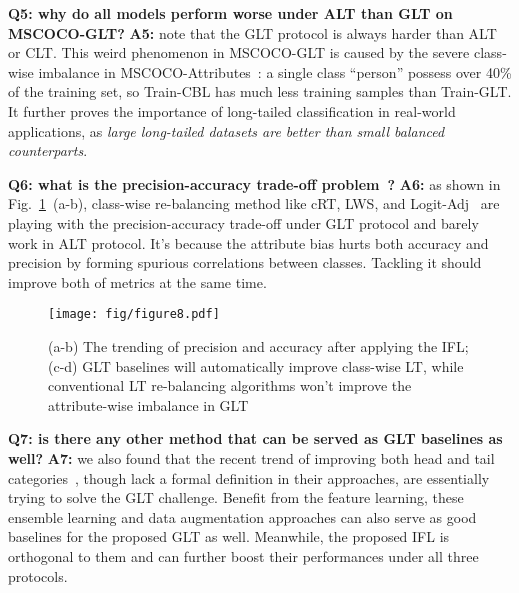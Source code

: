 \documentclass{article}
\begin{document}
\noindent\textbf{Q5: why do all models perform worse under ALT than GLT on MSCOCO-GLT?} \textbf{A5: } note that the GLT protocol is always harder than ALT or CLT. This weird phenomenon in MSCOCO-GLT is caused by the severe class-wise imbalance in MSCOCO-Attributes~\cite{patterson2016coco}: a single class ``person'' possess over 40\% of the training set, so Train-CBL has much less training samples than Train-GLT. It further proves the importance of long-tailed classification in real-world applications, as \textit{large long-tailed datasets are better than small balanced counterparts}. 





\noindent\textbf{Q6: what is the precision-accuracy trade-off problem~\cite{zhu2021cross}?} \textbf{A6:} as shown in Fig.~\ref{fig:8}~(a-b), class-wise re-balancing method like cRT, LWS, and Logit-Adj~\cite{kang2019decoupling,menon2020long} are playing with the precision-accuracy trade-off under GLT protocol and barely work in ALT protocol. It's because the attribute bias hurts both accuracy and precision by forming spurious correlations between classes. Tackling it should improve both of metrics at the same time.






\begin{figure}
  \texttt{[image: fig/figure8.pdf]}
  \caption{(a-b) The trending of precision and accuracy after applying the IFL; (c-d) GLT baselines will automatically improve class-wise LT, while conventional LT re-balancing algorithms won't improve the attribute-wise imbalance in GLT}
\label{fig:8}
\end{figure}










\noindent\textbf{Q7: is there any other method that can be served as GLT baselines as well?} \textbf{A7:} we also found that the recent trend of improving both head and tail categories~\cite{wang2020long,zhang2021test,zhu2021cross}, though lack a formal definition in their approaches, are essentially trying to solve the GLT challenge. Benefit from the feature learning, these ensemble learning and data augmentation approaches can also serve as good baselines for the proposed GLT as well. Meanwhile, the proposed IFL is orthogonal to them and can further boost their performances under all three protocols.
\end{document}
